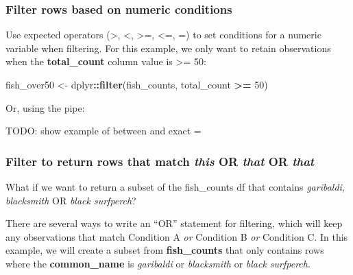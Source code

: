 \documentclass[]{book}
\newenvironment{Shaded}{\begin{snugshade}}{\end{snugshade}}
\newcommand{\DecValTok}[1]{\textcolor[rgb]{0.00,0.00,0.81}{#1}}
\newcommand{\KeywordTok}[1]{\textcolor[rgb]{0.13,0.29,0.53}{\textbf{#1}}}
\newcommand{\NormalTok}[1]{#1}
\newcommand{\OperatorTok}[1]{\textcolor[rgb]{0.81,0.36,0.00}{\textbf{#1}}}
\newcommand{\StringTok}[1]{\textcolor[rgb]{0.31,0.60,0.02}{#1}}
\begin{document}
\hypertarget{filter-rows-based-on-numeric-conditions}{%
\subsubsection{Filter rows based on numeric conditions}\label{filter-rows-based-on-numeric-conditions}}

Use expected operators (\textgreater{}, \textless{}, \textgreater{}=, \textless{}=, =) to set conditions for a numeric variable when filtering. For this example, we only want to retain observations when the \textbf{total\_count} column value is \textgreater{}= 50:

\begin{Shaded}
\begin{Highlighting}[]
\NormalTok{fish_over50 <-}\StringTok{ }\NormalTok{dplyr}\OperatorTok{::}\KeywordTok{filter}\NormalTok{(fish_counts, total_count }\OperatorTok{>=}\StringTok{ }\DecValTok{50}\NormalTok{)}
\end{Highlighting}
\end{Shaded}

Or, using the pipe:

\begin{Shaded}
\end{Shaded}

TODO: show example of between and exact =

\hypertarget{filter-to-return-rows-that-match-this-or-that-or-that}{%
\subsubsection{\texorpdfstring{Filter to return rows that match \emph{this} OR \emph{that} OR \emph{that}}{Filter to return rows that match this OR that OR that}}\label{filter-to-return-rows-that-match-this-or-that-or-that}}

What if we want to return a subset of the fish\_counts df that contains \emph{garibaldi}, \emph{blacksmith} OR \emph{black surfperch}?

There are several ways to write an ``OR'' statement for filtering, which will keep any observations that match Condition A \emph{or} Condition B \emph{or} Condition C. In this example, we will create a subset from \textbf{fish\_counts} that only contains rows where the \textbf{common\_name} is \emph{garibaldi} or \emph{blacksmith} or \emph{black surfperch}.
\end{document}
